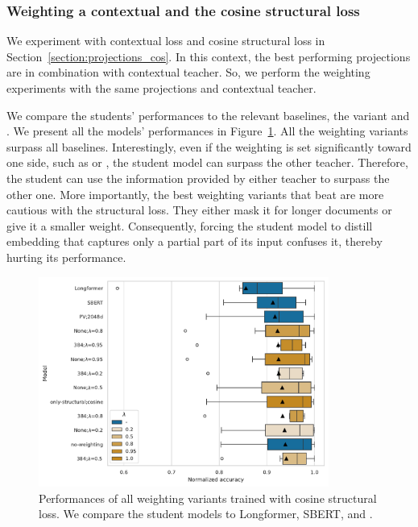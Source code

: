 \subsubsection{Weighting a contextual and the cosine structural loss}

We experiment with contextual loss and cosine structural loss in
Section~\ref{section:projections_cos}. In this context, the best performing
projections are  in combination with
 contextual teacher. So, we perform the weighting
experiments with the same projections and contextual teacher.

We compare the students' performances to the relevant baselines, the
 variant and . We present
all the models' performances in Figure~\ref{fig:cos_weighting}. All the
weighting variants surpass all baselines. Interestingly, even if the weighting
is set significantly toward one side, such as  or
, the student model can surpass the other
teacher. Therefore, the student can use the information provided by
either teacher to surpass the other one. More importantly, the best weighting
variants that beat  are more cautious with the
structural loss. They either mask it for longer documents or give it a smaller
weight. Consequently, forcing the student model to distill
embedding that captures only a partial part of its input confuses it, thereby hurting its performance.

\begin{figure}
  \centering
  \includegraphics[width=0.85\textwidth]{img/cos_weighting.pdf}

  \caption{Performances of all weighting variants trained with cosine
  structural loss. We compare the student models to Longformer, SBERT, and
  .}

  \label{fig:cos_weighting}

\end{figure}

